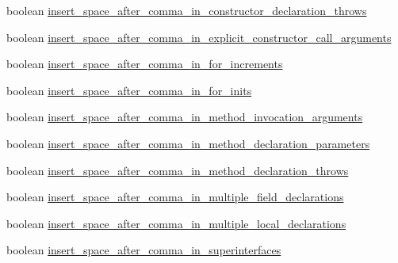 \begin{DoxyCompactItemize}
\item 
boolean \hyperlink{classorg_1_1eclipse_1_1jdt_1_1ui_1_1tests_1_1refactoring_1_1infra_1_1TestFormatterOptions_a89f215b621016508604e501da9e57c02}{insert\_\-space\_\-after\_\-comma\_\-in\_\-constructor\_\-declaration\_\-throws}
\item 
boolean \hyperlink{classorg_1_1eclipse_1_1jdt_1_1ui_1_1tests_1_1refactoring_1_1infra_1_1TestFormatterOptions_abcfb350b0373ebaafae1adc26e4dc1e2}{insert\_\-space\_\-after\_\-comma\_\-in\_\-explicit\_\-constructor\_\-call\_\-arguments}
\item 
boolean \hyperlink{classorg_1_1eclipse_1_1jdt_1_1ui_1_1tests_1_1refactoring_1_1infra_1_1TestFormatterOptions_ab19265adb013c7869acb47c042d4953c}{insert\_\-space\_\-after\_\-comma\_\-in\_\-for\_\-increments}
\item 
boolean \hyperlink{classorg_1_1eclipse_1_1jdt_1_1ui_1_1tests_1_1refactoring_1_1infra_1_1TestFormatterOptions_a5b38b86019fb71cdb209aa954e398819}{insert\_\-space\_\-after\_\-comma\_\-in\_\-for\_\-inits}
\item 
boolean \hyperlink{classorg_1_1eclipse_1_1jdt_1_1ui_1_1tests_1_1refactoring_1_1infra_1_1TestFormatterOptions_a2fade112a761293996542bbeeda6d010}{insert\_\-space\_\-after\_\-comma\_\-in\_\-method\_\-invocation\_\-arguments}
\item 
boolean \hyperlink{classorg_1_1eclipse_1_1jdt_1_1ui_1_1tests_1_1refactoring_1_1infra_1_1TestFormatterOptions_a21755419032f43f7a5640189b4539d20}{insert\_\-space\_\-after\_\-comma\_\-in\_\-method\_\-declaration\_\-parameters}
\item 
boolean \hyperlink{classorg_1_1eclipse_1_1jdt_1_1ui_1_1tests_1_1refactoring_1_1infra_1_1TestFormatterOptions_ae4cfe2a283c710154faf0b4ba03e6506}{insert\_\-space\_\-after\_\-comma\_\-in\_\-method\_\-declaration\_\-throws}
\item 
boolean \hyperlink{classorg_1_1eclipse_1_1jdt_1_1ui_1_1tests_1_1refactoring_1_1infra_1_1TestFormatterOptions_a861024a999bc788b71ec4d69d58ac072}{insert\_\-space\_\-after\_\-comma\_\-in\_\-multiple\_\-field\_\-declarations}
\item 
boolean \hyperlink{classorg_1_1eclipse_1_1jdt_1_1ui_1_1tests_1_1refactoring_1_1infra_1_1TestFormatterOptions_a00c785830951ab60fcbe13325b3a48ec}{insert\_\-space\_\-after\_\-comma\_\-in\_\-multiple\_\-local\_\-declarations}
\item 
boolean \hyperlink{classorg_1_1eclipse_1_1jdt_1_1ui_1_1tests_1_1refactoring_1_1infra_1_1TestFormatterOptions_af068c693bdd691bf9e3c83ea511f822f}{insert\_\-space\_\-after\_\-comma\_\-in\_\-superinterfaces}

\end{DoxyCompactItemize}
